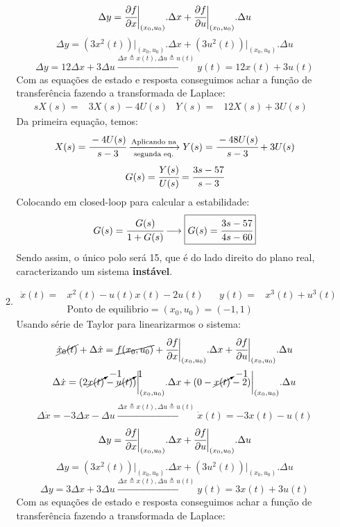 \documentclass[a4paper,11pt]{article}
\begin{document}
\begin{enumerate}
\begin{enumerate}
		\newpage
		$$\Delta y= \cfrac{\partial f}{\partial x}\bigg\rvert_{(x_0,u_0)}.\Delta x+\cfrac{\partial f}{\partial u}\bigg\rvert_{(x_0,u_0)}.\Delta u$$
		\vskip0.1cm
		$$\Delta y=(3x^2(t))\bigg\rvert_{(x_0,u_0)}.\Delta x+(3u^2(t))\bigg\rvert_{(x_0,u_0)}.\Delta u $$
		\vskip0.1cm
		$$ \Delta y=12\Delta x+3\Delta u\xrightarrow{\Delta x\triangleq x(t),\Delta u\triangleq u(t)}\boxed{y(t)=12x(t)+3u(t)} $$
		\vskip0.1cm
		Com as equações de estado e resposta conseguimos achar a função de transferência fazendo a transformada de Laplace:
		\begin{align*}
		sX(s)=&3X(s)-4U(s)&Y(s)=&12X(s)+3U(s)&
		\end{align*}
		Da primeira equação, temos:\\
		$$ X(s)=\cfrac{-4U(s)}{s-3}\xrightarrow[\text{segunda eq.}]{\text{Aplicando na}}Y(s)=\cfrac{-48U(s)}{s-3}+3U(s) $$
		\vskip0.1cm
		$$G(s)=\cfrac{Y(s)}{U(s)}=\cfrac{3s-57}{s-3}$$
		\vskip0.1cm
		Colocando em closed-loop para calcular a estabilidade:
		\vskip0.1cm
		$$ G(s)=\cfrac{G(s)}{1+G(s)}\longrightarrow \boxed{G(s)=\cfrac{3s-57}{4s-60}} $$
		\vskip0.1cm
		Sendo assim, o único polo será 15, que é do lado direito do plano real, caracterizando um sistema \textbf{instável}.
		\item 
		\begin{align*}
		\dot{x}(t)=&x^2(t)-u(t)x(t)-2u(t)&
		y(t)=&x^3(t)+u^3(t)&\\
		&\text{Ponto de equilibrio}=(x_0,u_0)=(-1,1)
		\end{align*}
		Usando série de Taylor para linearizarmos o sistema:
		\vskip0.1cm
		$$\cancel{\dot{x}_0(t)}+\Delta\dot{x}=\cancel{f(x_0,u_0)}+\cfrac{\partial f}{\partial x}\bigg\rvert_{(x_0,u_0)}.\Delta x+\cfrac{\partial f}{\partial u}\bigg\rvert_{(x_0,u_0)}.\Delta u $$
		\vskip0.1cm
		$$\Delta\dot{x}=(2\cancelto{-1}{x(t)}-\cancelto{1}{u(t)})\bigg\rvert_{(x_0,u_0)}.\Delta x+(0-\cancelto{-1}{x(t)}-2)\bigg\rvert_{(x_0,u_0)}.\Delta u$$
		\vskip0.1cm
		$$ \Delta\dot{x}=-3\Delta x-\Delta u\xrightarrow{\Delta x\triangleq x(t),\Delta u\triangleq u(t)}\boxed{\dot{x}(t)=-3x(t)-u(t)}$$
		\vskip0.1cm
		$$\Delta y= \cfrac{\partial f}{\partial x}\bigg\rvert_{(x_0,u_0)}.\Delta x+\cfrac{\partial f}{\partial u}\bigg\rvert_{(x_0,u_0)}.\Delta u$$
		\vskip0.1cm
		$$\Delta y=(3x^2(t))\bigg\rvert_{(x_0,u_0)}.\Delta x+(3u^2(t))\bigg\rvert_{(x_0,u_0)}.\Delta u $$
		\vskip0.1cm
		$$ \Delta y=3\Delta x+3\Delta u\xrightarrow{\Delta x\triangleq x(t),\Delta u\triangleq u(t)}\boxed{y(t)=3x(t)+3u(t)} $$
		\vskip0.1cm
		Com as equações de estado e resposta conseguimos achar a função de transferência fazendo a transformada de Laplace:

\end{enumerate}
\end{enumerate}
\end{document}
